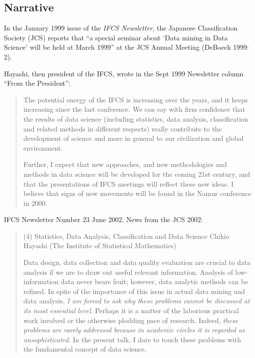 \documentclass[
  letterpaper,
]{report}
\begin{document}
\hypertarget{narrative}{%
\subsection{Narrative}\label{narrative}}

In the January 1999 issue of the \emph{IFCS Newsletter}, the Japanese
Classification Society (JCS) reports that ``a special seminar about
`Data mining in Data Science' will be held at March 1999'' at the JCS
Annual Meeting (DeBoeck 1999: 2).

Hayashi, then president of the IFCS, wrote in the Sept 1999 Newsletter
column ``From the President'':

\begin{quote}
The potential energy of the IFCS is increasing over the years, and it
keeps increasing since the last conference. We can say with firm
confidence that the results of data science (including statistics, data
analysis, classification and related methods in different respects)
really contribute to the development of science and more in general to
our civilization and global environment.

Further, I expect that new approaches, and new methodologies and methods
in data science will be developed for the coming 21st century, and that
the presentations of IFCS meetings will reflect these new ideas. I
believe that signs of new movements will be found in the Namur
conference in 2000.
\end{quote}

IFCS Newsletter Number 23 June 2002. News from the JCS 2002:

\begin{quote}
(4) Statistics, Data Analysis, Classification and Data Science Chikio
Hayashi (The Institute of Statistical Mathematics)

Data design, data collection and data quality evaluation are crucial to
data analysis if we are to draw out useful relevant information.
Analysis of low-information data never bears fruit; however, data
analytic methods can be refined. In spite of the importance of this
issue in actual data mining and data analysis, \emph{I am forced to ask
why these problems cannot be discussed at its most essential level}.
Perhaps it is a matter of the laborious practical work involved or the
otherwise plodding pace of research. Indeed, \emph{these problems are
rarely addressed because in academic circles it is regarded as
unsophisticated}. In the present talk, I dare to touch these problems
with the fundamental concept of data science.
\end{quote}
\end{document}

